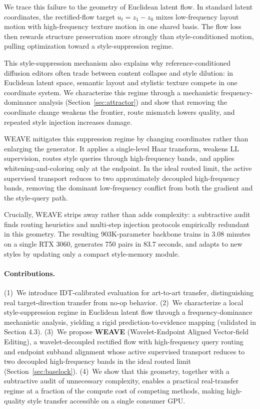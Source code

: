 \documentclass[letterpaper]{article}
\begin{document}
We trace this failure to the geometry of Euclidean latent flow.
In standard latent coordinates, the rectified-flow target $u_t=z_1-z_0$ mixes low-frequency layout motion with high-frequency texture motion in one shared basis.
The flow loss then rewards structure preservation more strongly than style-conditioned motion, pulling optimization toward a style-suppression regime.

This style-suppression mechanism also explains why reference-conditioned diffusion editors often trade between content collapse and style dilution: in Euclidean latent space, semantic layout and stylistic texture compete in one coordinate system.
We characterize this regime through a mechanistic frequency-dominance analysis (Section~\ref{sec:attractor}) and show that removing the coordinate change weakens the frontier, route mismatch lowers quality, and repeated style injection increases damage.

WEAVE mitigates this suppression regime by changing coordinates rather than enlarging the generator.
It applies a single-level Haar transform, weakens LL supervision, routes style queries through high-frequency bands, and applies whitening-and-coloring only at the endpoint.
In the ideal routed limit, the active supervised transport reduces to two approximately decoupled high-frequency bands, removing the dominant low-frequency conflict from both the gradient and the style-query path.

Crucially, WEAVE strips away rather than adds complexity: a subtractive audit finds routing heuristics and multi-step injection protocols empirically redundant in this geometry.
The resulting 903K-parameter backbone trains in 3.08 minutes on a single RTX 3060, generates 750 pairs in 83.7 seconds, and adapts to new styles by updating only a compact style-memory module.

\paragraph{Contributions.}
(1)~We introduce IDT-calibrated evaluation for art-to-art transfer, distinguishing real target-direction transfer from no-op behavior.
(2)~We characterize a local style-suppression regime in Euclidean latent flow through a frequency-dominance mechanistic analysis, yielding a rigid prediction-to-evidence mapping (validated in Section 4.3).
(3)~We propose \textbf{WEAVE} (Wavelet-Endpoint Aligned Vector-field Editing), a wavelet-decoupled rectified flow with high-frequency query routing and endpoint subband alignment whose active supervised transport reduces to two decoupled high-frequency bands in the ideal routed limit (Section~\ref{sec:baselock}).
(4)~We show that this geometry, together with a subtractive audit of unnecessary complexity, enables a practical real-transfer regime at a fraction of the compute cost of competing methods, making high-quality style transfer accessible on a single consumer GPU.
\end{document}
